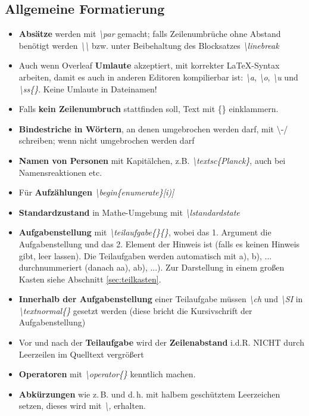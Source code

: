 \documentclass[../main.tex]{subfiles}
\begin{document}
\subsection{Allgemeine Formatierung}
\begin{itemize}
    \item \textbf{Abs\"atze} werden mit \hypertarget{par}{\textit{\textbackslash par}} gemacht; falls Zeilenumbr\"uche ohne Abstand ben\"otigt werden \hypertarget{textbackslash}{\textit{\textbackslash\textbackslash}} bzw. unter Beibehaltung des Blocksatzes \textit{\hypertarget{linebreak}{\textbackslash linebreak}}
    \item Auch wenn Overleaf \textbf{Umlaute} akzeptiert, mit korrekter \LaTeX-Syntax arbeiten, damit es auch in anderen Editoren kompilierbar ist: \hypertarget{a}{\textit{\textbackslash\grqq{}a}}, \hypertarget{o}{\textit{\textbackslash\grqq{}o}}, \hypertarget{u}{\textit{\textbackslash\grqq{}u}} und \hypertarget{ss}{\textit{\textbackslash ss\{\}}}. Keine Umlaute in Dateinamen!
    \item Falls \textbf{kein Zeilenumbruch} stattfinden soll, Text mit \{\} einklammern.  
    \item \textbf{Bindestriche in W\"ortern}, an denen umgebrochen werden darf, mit \textbackslash -/ schreiben; wenn nicht umgebrochen werden darf 
    \item \textbf{Namen von Personen} mit Kapit\"alchen, z.B. \hypertarget{textsc}{\textit{\textbackslash textsc\{Planck\}}}, auch bei Namensreaktionen etc.
    
    
    \item F\"ur \textbf{Aufz\"ahlungen} \hypertarget{beginenumerate}{\textit{\textbackslash begin\{enumerate\}[i)]}}
    \item \textbf{Standardzustand} in Mathe-Umgebung mit \textit{\hypertarget{lstandardstate}{\textbackslash lstandardstate}}
    \item \textbf{Aufgabenstellung} mit \textit{\hypertarget{teilaufgabe}{\textbackslash teilaufgabe\{\}\{\}}}, wobei das 1. Argument die Aufgabenstellung und das 2. Element der Hinweis ist (falls es keinen Hinweis gibt, leer lassen). Die Teilaufgaben werden automatisch mit a), b), ... durchnummeriert (danach aa), ab), ...). Zur Darstellung in einem gro\ss{}en Kasten siehe Abschnitt \ref{sec:teilkasten}.
    \item \hypertarget{textnormal}{} \textbf{Innerhalb der Aufgabenstellung} einer Teilaufgabe m\"ussen \textit{\textbackslash ch} und \textit{\textbackslash SI} in \textit{\textbackslash textnormal\{\}} gesetzt werden (diese bricht die Kursivschrift der Aufgabenstellung)
    \item Vor und nach der \textbf{Teilaufgabe} wird der \textbf{Zeilenabstand} i.d.R. NICHT durch Leerzeilen im Quelltext vergr\"o\ss{}ert
    \item \textbf{Operatoren} mit \textit{\hypertarget{operator}{\textbackslash operator\{\}}} kenntlich machen.
    \item \hypertarget{,}{} \textbf{Abk\"urzungen} wie z.\,B. und d.\,h. mit halbem gesch\"utztem Leerzeichen setzen, dieses wird mit \textit{\textbackslash ,} erhalten.
\end{itemize}
\end{document}
